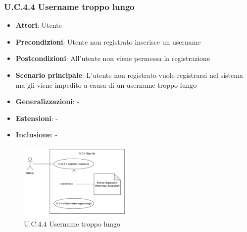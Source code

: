 \subsubsection{U.C.4.4 Username troppo lungo}
\begin{itemize}
    \item \textbf{Attori}: Utente
    \item \textbf{Precondizioni}: Utente non registrato inserisce un username
    \item \textbf{Postcondizioni}: All'utente non viene permessa la registrazione
    \item \textbf{Scenario principale}: L’utente non registrato vuole registrarsi nel sistema ma gli viene impedito a causa di un username troppo lungo
    \item \textbf{Generalizzazioni}: -
    \item \textbf{Estensioni}: -
    \item \textbf{Inclusione}: -
\end{itemize}
\begin{figure}[H]
    \centering
    \includegraphics[width=0.5\textwidth]{img/UC4-4.png}
    \caption{U.C.4.4 Username troppo lungo}
\end{figure}
\newpage
